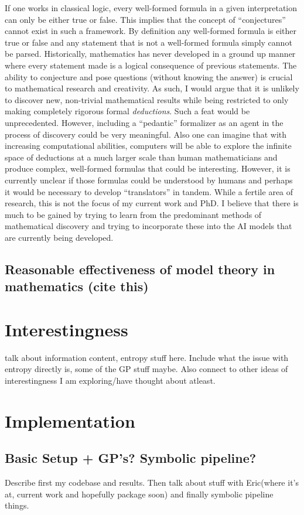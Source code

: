 \begin{definition}
If one works in classical logic, every well-formed formula in a given interpretation can only be either true or false. This implies that the concept of ``conjectures'' cannot exist in such a framework. By definition any well-formed formula is either true or false
and any statement that is not a well-formed formula simply cannot be parsed. Historically, mathematics has never developed in a ground up manner where every statement made is a logical consequence of previous statements. The ability to conjecture and pose questions (without knowing the answer) is crucial to mathematical research and creativity. As such, I would argue that it is unlikely to discover new, non-trivial mathematical results while being restricted to only making completely rigorous formal \textit{deductions}. Such a feat would be unprecedented.
However, including a ``pedantic'' formalizer as an agent in the process of discovery could be very meaningful. Also one can imagine that with increasing computational abilities, computers will be able to explore the infinite space of deductions at a much larger scale than human mathematicians and produce
complex, well-formed formulas that could be interesting. However, it is currently unclear if those formulas could be understood by humans and perhaps it would be necessary to develop ``translators'' in tandem. While a fertile area of research, this is not the focus of my current work and PhD. I believe that there is much to be gained by trying to learn from the predominant methods of mathematical discovery and trying to incorporate these into the AI models that are currently being developed.

\subsection{Reasonable effectiveness of model theory in mathematics (cite this)}

\section{Interestingness}
talk about information content, entropy stuff here. Include what the issue with entropy directly is, some of the GP stuff maybe. Also connect to other ideas of interestingness I am exploring/have thought about atleast.

\section{Implementation}
\subsection{Basic Setup + GP's? Symbolic pipeline?}
Describe first my codebase and results. Then talk about stuff with Eric(where it's at, current work and hopefully package soon) and finally symbolic pipeline things.

\end{definition}
